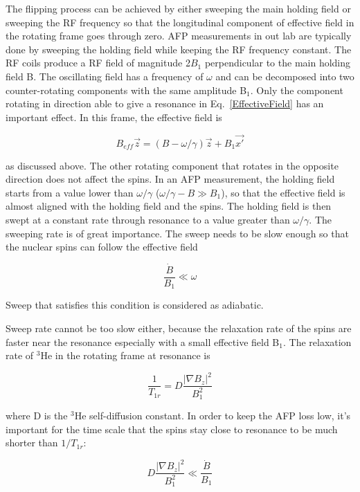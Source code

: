 The flipping process can be achieved by either sweeping the main holding field or sweeping the RF frequency so that the longitudinal component of effective field in the rotating frame goes through zero. AFP measurements in out lab are typically done by sweeping the holding field while keeping the RF frequency constant. The RF coils produce a RF field of magnitude 2$B_{1}$ perpendicular to the main holding field B. The oscillating field has a frequency of $\omega$ and can be decomposed into two counter-rotating components with the same amplitude B$_{1}$. Only the component rotating in direction able to give a resonance in Eq.~\ref{EffectiveField} has an important effect. In this frame, the effective field is

\begin{equation}
B_{eff}\vec{z}=(B-\omega/\gamma)\vec{z} + B_{1}\vec{x'}
\end{equation}

as discussed above. The other rotating component that rotates in the opposite direction does not affect the spins. In an AFP measurement, the holding field starts from a value lower than $\omega/\gamma$ ($\omega/\gamma-B\gg B_{1}$), so that the effective field is almost aligned with the holding field and the spins. The holding field is then swept at a constant rate through resonance to a value greater than $\omega/\gamma$. The sweeping rate is of great importance. The sweep needs to be slow enough so that the nuclear spins can follow the effective field

\begin{equation}
\frac{\dot B}{B_{1}}\ll \omega
\end{equation}

Sweep that satisfies this condition is considered as adiabatic.

Sweep rate cannot be too slow either, because the relaxation rate of the spins are faster near the resonance especially with a small effective field B$_{1}$. The relaxation rate of $^{3}$He in the rotating frame at resonance is 

\begin{equation}
\frac{1}{T_{1r}}=D\frac{|\nabla B_{z}|^{2}}{B_{1}^{2}} 
\end{equation}

where D is the $^{3}$He self-diffusion constant. In order to keep the AFP loss low, it's important for the time scale that the spins stay close to resonance to be much shorter than $1/T_{1r}$:

\begin{equation}
D\frac{|\nabla B_{z}|^{2}}{B_{1}^{2}} \ll \frac{\dot B}{B_{1}}
\end{equation}

